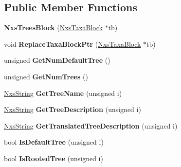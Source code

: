 \subsection*{Public Member Functions}
\begin{DoxyCompactItemize}
\item 
\hypertarget{classNxsTreesBlock_a704547f062feafaf84297830b402e8eb}{
{\bfseries NxsTreesBlock} (\hyperlink{classNxsTaxaBlock}{NxsTaxaBlock} $\ast$tb)}
\label{classNxsTreesBlock_a704547f062feafaf84297830b402e8eb}

\item 
\hypertarget{classNxsTreesBlock_ad28d89fdc04168557dcfeaf287311340}{
void {\bfseries ReplaceTaxaBlockPtr} (\hyperlink{classNxsTaxaBlock}{NxsTaxaBlock} $\ast$tb)}
\label{classNxsTreesBlock_ad28d89fdc04168557dcfeaf287311340}

\item 
\hypertarget{classNxsTreesBlock_ac0b38cb4008db1b378aa4dd0d2860bd3}{
unsigned {\bfseries GetNumDefaultTree} ()}
\label{classNxsTreesBlock_ac0b38cb4008db1b378aa4dd0d2860bd3}

\item 
\hypertarget{classNxsTreesBlock_ab8482cf659047135f64473ae241eae70}{
unsigned {\bfseries GetNumTrees} ()}
\label{classNxsTreesBlock_ab8482cf659047135f64473ae241eae70}

\item 
\hypertarget{classNxsTreesBlock_a6498e89a41074ff0f3f330b89c6abb06}{
\hyperlink{classNxsString}{NxsString} {\bfseries GetTreeName} (unsigned i)}
\label{classNxsTreesBlock_a6498e89a41074ff0f3f330b89c6abb06}

\item 
\hypertarget{classNxsTreesBlock_aa00e91e2ff1a4482d6c162ccc3486eef}{
\hyperlink{classNxsString}{NxsString} {\bfseries GetTreeDescription} (unsigned i)}
\label{classNxsTreesBlock_aa00e91e2ff1a4482d6c162ccc3486eef}

\item 
\hypertarget{classNxsTreesBlock_aad4276c6d0813bfafb138f55a6f42ad5}{
\hyperlink{classNxsString}{NxsString} {\bfseries GetTranslatedTreeDescription} (unsigned i)}
\label{classNxsTreesBlock_aad4276c6d0813bfafb138f55a6f42ad5}

\item 
\hypertarget{classNxsTreesBlock_a497c23c2acca696f9248ab88bf2db946}{
bool {\bfseries IsDefaultTree} (unsigned i)}
\label{classNxsTreesBlock_a497c23c2acca696f9248ab88bf2db946}

\item 
\hypertarget{classNxsTreesBlock_aee81a3a2830bd695566e3b0d1b5d079f}{
bool {\bfseries IsRootedTree} (unsigned i)}
\label{classNxsTreesBlock_aee81a3a2830bd695566e3b0d1b5d079f}


\end{DoxyCompactItemize}
